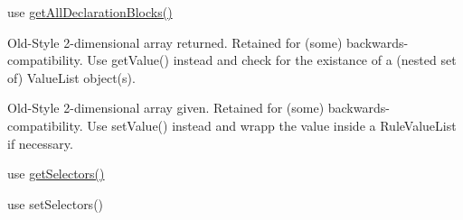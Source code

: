 
\begin{DoxyRefList}
\item[Member \mbox{\hyperlink{class_sabberworm_1_1_c_s_s_1_1_c_s_s_list_1_1_document_ac5c5194faf2a24943621892389eae2f8}{Sabberworm\textbackslash{}CSS\textbackslash{}CSSList\textbackslash{}Document\+::get\+All\+Selectors}} ()]\label{deprecated__deprecated000001}%
%
use \mbox{\hyperlink{class_sabberworm_1_1_c_s_s_1_1_c_s_s_list_1_1_document_a1edddd2faf3c8ab38b7e0a2d303b9d24}{get\+All\+Declaration\+Blocks()}}  
\item[Member \mbox{\hyperlink{class_sabberworm_1_1_c_s_s_1_1_rule_1_1_rule_ad4eb5c44e12d2730293e4ca90ed57a9a}{Sabberworm\textbackslash{}CSS\textbackslash{}Rule\textbackslash{}Rule\+::get\+Values}} ()]\label{deprecated__deprecated000003}%
%
Old-\/\+Style 2-\/dimensional array returned. Retained for (some) backwards-\/compatibility. Use get\+Value() instead and check for the existance of a (nested set of) Value\+List object(s).  
\item[Member \mbox{\hyperlink{class_sabberworm_1_1_c_s_s_1_1_rule_1_1_rule_ae885de84ee1f6dd4ab1027ce44a1be5c}{Sabberworm\textbackslash{}CSS\textbackslash{}Rule\textbackslash{}Rule\+::set\+Values}} (\$a\+Space\+Separated\+Values)]\label{deprecated__deprecated000002}%
%
Old-\/\+Style 2-\/dimensional array given. Retained for (some) backwards-\/compatibility. Use set\+Value() instead and wrapp the value inside a Rule\+Value\+List if necessary.  
\item[Member \mbox{\hyperlink{class_sabberworm_1_1_c_s_s_1_1_rule_set_1_1_declaration_block_ab85a1d4ad64ebda2147791f6e8c4d35a}{Sabberworm\textbackslash{}CSS\textbackslash{}Rule\+Set\textbackslash{}Declaration\+Block\+::get\+Selector}} ()]\label{deprecated__deprecated000004}%
%
use \mbox{\hyperlink{class_sabberworm_1_1_c_s_s_1_1_rule_set_1_1_declaration_block_a999712cb450fb0a2a51745ab7fd50977}{get\+Selectors()}}  
\item[Member \mbox{\hyperlink{class_sabberworm_1_1_c_s_s_1_1_rule_set_1_1_declaration_block_a80c3e48792fa17f21d850753c1c18e51}{Sabberworm\textbackslash{}CSS\textbackslash{}Rule\+Set\textbackslash{}Declaration\+Block\+::set\+Selector}} (\$m\+Selector)]\label{deprecated__deprecated000005}%
%
use set\+Selectors() 
\end{DoxyRefList}